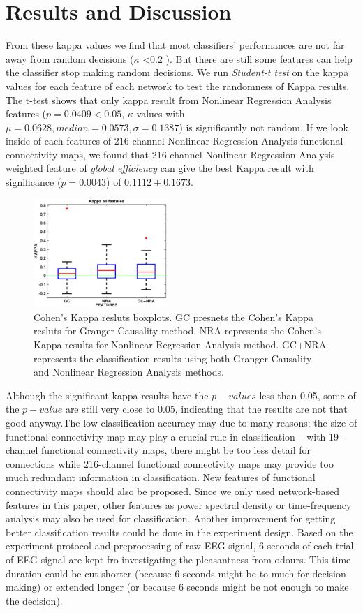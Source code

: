 \section{Results and Discussion}

From these kappa values we find that most classifiers' performances are not far away from random decisions ($\kappa$ <0.2 \cite{cohenskappa}). But there are still some features can help the classifier stop making random decisions. We run \emph{Student-t test} on the kappa values for each feature of each network to test the randomness of Kappa results. The t-test shows that only kappa result from Nonlinear Regression Analysis features ($p = 0.0409 < 0.05$, $\kappa$ values with $\mu = 0.0628, median = 0.0573,\sigma = 0.1387$) is significantly not random. If we look inside of each features of 216-channel Nonlinear Regression Analysis functional connectivity maps, we found that  216-channel Nonlinear Regression Analysis weighted feature of \emph{global efficiency} can give the best Kappa result with significance ($p = 0.0043$) of $0.1112 \pm 0.1673$.

\begin{figure}[!t]
    \centering
    \includegraphics[width=0.45\textwidth]{./images/kappa.eps}
    \caption{Cohen's Kappa resluts boxplots. GC presnets the Cohen's Kappa resluts for Granger Causality method. NRA represents the Cohen's Kappa results for Nonlinear Regression Analysis method. GC+NRA represents the classification results using both Granger Causality and Nonlinear Regression Analysis methods.}
    \label{fig:kaapa}
\end{figure}

Although the significant kappa results have the $p-values$ less than 0.05, some of the $p-value$ are still very close to 0.05, indicating that the results are not that good anyway.The low classification accuracy may due to many reasons: the size of functional connectivity map may play a crucial rule in classification -- with 19-channel functional connectivity maps, there might be too less detail for connections while 216-channel functional connectivity maps may provide too much redundant information in classification. New features of functional connectivity maps should also be proposed. Since we only used network-based features in this paper, other features as power spectral density or time-frequency analysis may also be used for classification. Another improvement for getting better classification results could be done in the experiment design. Based on the experiment protocol and preprocessing of raw EEG signal, 6 seconds of each trial of EEG signal are kept fro investigating the pleasantness from odours. This time duration could be cut shorter (because 6 seconds might be to much for decision making) or extended longer (or because 6 seconds might be not enough to make the decision).